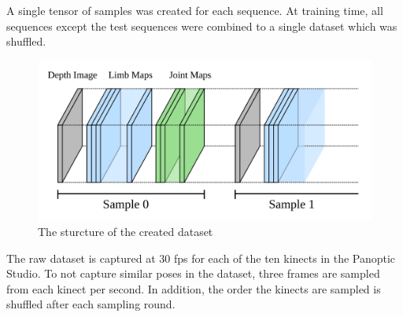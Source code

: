 A single tensor of samples was created for each sequence. At training time, all sequences except the test sequences were combined to a single dataset which was shuffled.

\begin{figure}
  \centering
  \includegraphics[width=.8\textwidth]{img/targets}
  \caption[Data Tensors]{The sturcture of the created dataset}
  \label{fig:targets}
\end{figure}

The raw dataset is captured at 30 fps for each of the ten kinects in the Panoptic Studio. To not capture similar poses in the dataset, three frames are sampled from each kinect per second. In addition, the order the kinects are sampled is shuffled after each sampling round.

